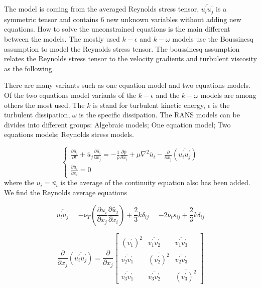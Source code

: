 \documentclass{article}
\begin{document}
The model is coming from the averaged Reynolds stress tensor, $\bar{u_l ^\prime u_j ^\prime}$ is a symmetric tensor and contains 6 new unknown variables without adding new equations. How to solve the unconstrained equations is the main different between the models. The mostly used $k−\epsilon $ and $k−\omega $ models use the Boussinesq assumption to model the Reynolds stress tensor. The boussinesq assumption relates the Reynolds stress tensor to the velocity gradients and turbulent viscosity as the following. 

There are many variants such as one equation model and two equations models. Of the two equations model variants of the $k−\epsilon $ and the $k−\omega $ models are among others the most used.  The $ k $ is stand for turbulent kinetic energy, $ \epsilon $ is the turbulent dissipation, $\omega$ is the specific dissipation. The RANS models can be divides into different groups: Algebraic models; One equation model; Two equations models; Reynolds stress models. 

\begin{equation}
\begin{cases}
\frac{\partial \overline{u}_i}{\partial t} + \overline{u}_j \frac{\partial \overline{u}_i}{\partial x_j} = -\frac{1}{\rho}\frac{\partial \overline{p}}{\partial x_i} + \mu \nabla^2\overline{u}_i-\frac{\partial}{\partial x_j}(\overline{u_i ^\prime u_j ^\prime})\\
\frac{\partial \overline{u}_i}{\partial x_i} = 0
\end{cases}
\end{equation}
where the $u_i = \bar{u_i}$ is the average of the continuity equation also has been added. We find the Reynolds average equations

\begin{equation}
\overline{u_l ^\prime u_j ^\prime}=-\nu _T(\frac{\partial \bar u_i}{\partial x_j} 
 \frac{\partial \bar u_j}{\partial x_i})+\frac{2}{3}k\delta _{ij}=-2\nu _t s_{ij} +\frac{2}{3}k\delta _{ij}
\end{equation}

\begin{equation}
\frac{\partial}{\partial x_j}(\overline{u_i ^\prime u_j ^\prime})
 = \frac{\partial}{\partial x_j}
  \begin{bmatrix}
   \overline{(v_1 ^\prime)^2} & \overline{v_1 ^\prime v_2 ^\prime}  &  \overline{v_1 ^\prime v_3 ^\prime} \\
   \overline{v_2 ^\prime v_1 ^\prime} &  \overline{(v_2 ^\prime)^2} &   \overline{v_2 ^\prime v_3 ^\prime} \\
   \overline{v_3 ^\prime v_1 ^\prime} &  \overline{v_3 ^\prime v_2 ^\prime} & \overline{(v_3 ^\prime)^2}   
   \end{bmatrix}
\end{equation}
\end{document}
